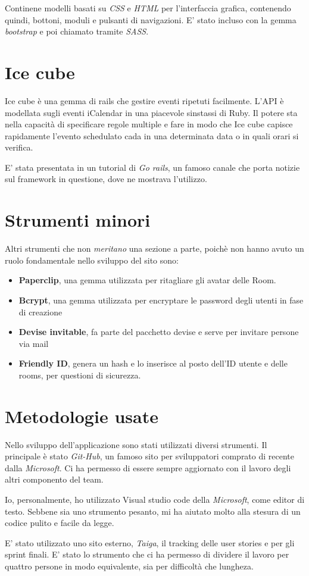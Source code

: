 	Continene modelli basati su \textit{CSS} e \textit{HTML} per l'interfaccia grafica, contenendo quindi, bottoni, moduli e pulsanti di navigazioni. E' stato incluso con la gemma \textit{bootstrap} e poi chiamato tramite \textit{SASS}.
	
	\section{Ice cube}
	Ice cube è una gemma di rails che gestire eventi ripetuti facilmente. L'API è modellata sugli eventi iCalendar in una piacevole sinstassi di Ruby. Il potere sta nella capacità di specificare regole multiple e fare in modo che Ice cube capisce rapidamente l'evento schedulato cada in una determinata data o in quali orari si verifica.
	
	E' stata presentata in un tutorial di \textit{Go rails}, un famoso canale che porta notizie sul framework in questione, dove ne mostrava l'utilizzo.
	
	\section{Strumenti minori}
	Altri strumenti che non \textit{meritano} una sezione a parte, poichè non hanno avuto un ruolo fondamentale nello sviluppo del sito sono: 
	\begin{itemize}	
		\item \textbf{Paperclip}, una gemma utilizzata per ritagliare gli avatar delle Room.
		\item \textbf{Bcrypt}, una gemma utilizzata per encryptare le password degli utenti in fase di creazione
		\item \textbf{Devise invitable}, fa parte del pacchetto devise e serve per invitare persone via mail
		\item \textbf{Friendly ID}, genera un hash e lo inserisce al posto dell'ID utente e delle rooms, per questioni di sicurezza.
	\end{itemize}

	\section{Metodologie usate}
	Nello sviluppo dell'applicazione sono stati utilizzati diversi strumenti. Il principale è stato \textit{Git-Hub}, un famoso sito per sviluppatori comprato di recente dalla \textit{Microsoft}. Ci ha permesso di essere sempre aggiornato con il lavoro degli altri componento del team. 
	
	Io, personalmente, ho utilizzato Visual studio code della \textit{Microsoft}, come editor di testo. Sebbene sia uno strumento pesanto, mi ha aiutato molto alla stesura di un codice pulito e facile da legge.
	
	E' stato utilizzato uno sito esterno, \textit{Taiga}, il tracking delle user stories e per gli sprint finali. E' stato lo strumento che ci ha permesso di dividere il lavoro per quattro persone in modo equivalente, sia per difficoltà che lungheza.